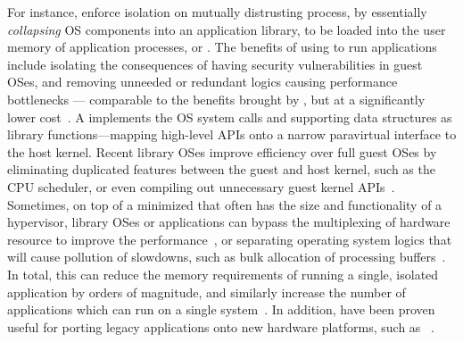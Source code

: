 For instance, \term{\liboses{}} enforce isolation on mutually distrusting process,
by essentially \emph{collapsing} OS components
into an application library, to be loaded into the user memory of application processes, or \term{\picoprocs{}}.
The benefits of using \liboses{} to run applications include
isolating the consequences of having security vulnerabilities in guest OSes,
and removing unneeded or redundant logics causing performance bottlenecks 
--- comparable to the benefits brought by ,
but at a significantly lower cost~\citep{porter11drawbridge,unikernels,baumann13bascule}.
A \libos{} implements the OS system calls and supporting data structures as library functions---mapping
high-level APIs onto
a narrow paravirtual interface to the host kernel.
Recent library OSes improve efficiency over full guest OSes by eliminating duplicated features
between the guest and host kernel,
such as the CPU scheduler, or
even compiling out unnecessary guest kernel APIs~\citep{unikernels}.
Sometimes, on top of a minimized \term{\microkernel{}} that often has the size and functionality of a hypervisor,
library OSes or applications can bypass the multiplexing of hardware resource
to improve the performance~\citep{engler95exokernel},
or separating operating system logics that will cause pollution of slowdowns,
such as bulk allocation of processing buffers~\citep{leslie96nemesis}.
In total, this can reduce the memory requirements of running a single, isolated application
by orders of magnitude, and similarly
increase the number of applications which can run
on a single system~\citep{porter11drawbridge,unikernels}.
In addition, \liboses{} have been proven
useful for porting legacy applications
onto new hardware platforms, such as ~\citep{baumann14haven}.


